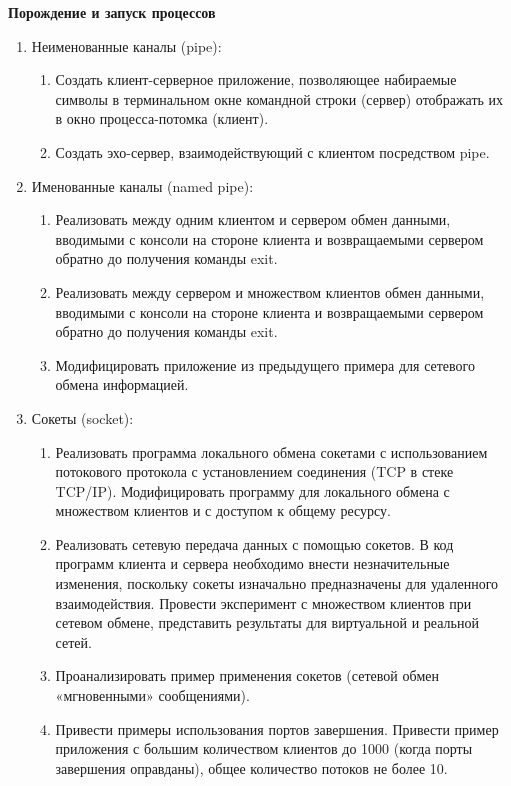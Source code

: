 \renewcommand{\labelenumii}{\theenumii}
\renewcommand{\theenumii}{\theenumi.\arabic{enumii}.}

\textbf{Порождение и запуск процессов}

\begin{enumerate}
	\item Неименованные каналы (pipe):
		\begin{enumerate}
			\item Создать клиент-серверное приложение, позволяющее набираемые символы в терминальном окне командной строки (сервер) отображать их в окно процесса-потомка (клиент).
			\item Создать эхо-сервер, взаимодействующий с клиентом посредством pipe.
		\end{enumerate}
	\item Именованные каналы (named pipe):
		\begin{enumerate}
			\item Реализовать между одним клиентом и сервером обмен данными, вводимыми с консоли на стороне клиента и возвращаемыми сервером обратно до получения команды exit.
			\item Реализовать между сервером и множеством клиентов обмен данными, вводимыми с консоли на стороне клиента и возвращаемыми сервером обратно до получения команды exit.
			\item Модифицировать приложение из предыдущего примера для сетевого обмена информацией.
		\end{enumerate}
	\item Сокеты (socket):
		\begin{enumerate}
			\item Реализовать программа локального обмена сокетами с использованием потокового протокола с установлением соединения (TCP в стеке TCP/IP). Модифицировать программу для локального обмена с множеством клиентов и с доступом к общему ресурсу.
			\item Реализовать сетевую передача данных с помощью сокетов. В код программ клиента и сервера необходимо внести незначительные изменения, поскольку сокеты изначально предназначены для удаленного взаимодействия. Провести эксперимент с множеством клиентов при сетевом обмене, представить результаты для виртуальной и реальной сетей.
			\item Проанализировать пример применения сокетов (сетевой обмен «мгновенными» сообщениями).
			\item Привести примеры использования портов завершения. Привести пример приложения с большим количеством клиентов до 1000 (когда порты завершения оправданы), общее количество потоков не более 10.

\end{enumerate}
\end{enumerate}

